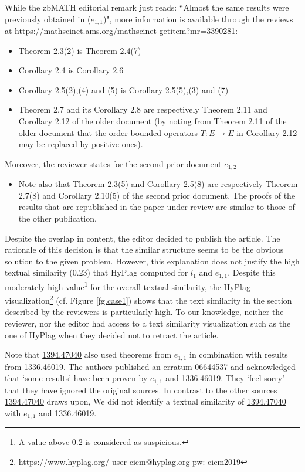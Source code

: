 \documentclass{llncs}
\newcommand{\zbl}[1]{\href{https://zbmath.org/?q=an:#1}{\textsf{#1}}}
\begin{document}
While the zbMATH editorial remark just reads: ``Almost the same results were previously obtained in ($e_{1,1}$)", more information is available through the reviews at \url{https://mathscinet.ams.org/mathscinet-getitem?mr=3390281}:
\begin{itemize}
\item Theorem 2.3(2) is Theorem 2.4(7)
\item Corollary 2.4 is Corollary 2.6
\item Corollary 2.5(2),(4) and (5) is Corollary 2.5(5),(3) and (7)
\item Theorem 2.7 and its Corollary 2.8 are respectively Theorem 2.11 and Corollary 2.12 of the older document (by noting from Theorem 2.11 of the older document that the order bounded operators $T:E\to E$ in Corollary 2.12 may be replaced by positive ones).
\end{itemize}
Moreover, the reviewer states for the second prior document $e_{1,2}$
\begin{itemize}
\item Note also that Theorem 2.3(5) and Corollary 2.5(8) are respectively Theorem 2.7(8) and Corollary 2.10(5) of the second prior document.
The proofs of the results that are republished in the paper under review are similar to those of the other publication.
\end{itemize}

Despite the overlap in content, the editor decided to publish the article. The rationale of this decision is that the similar structure seems to be the obvious solution to the given problem. However, this explanation does not justify the high textual similarity (0.23) that HyPlag computed for $l_1$ and $e_{1,1}$. Despite this moderately high value\footnote{A value above 0.2 is considered as suspicious.} for the overall textual similarity, the HyPlag visualization\footnote{\url{https://www.hyplag.org/} user cicm@hyplag.org pw: cicm2019} (cf. Figure \ref{fg.case1}) shows that the text similarity in the section described by the reviewers is particularly high. To our knowledge, neither the reviewer, nor the editor had access to a text similarity visualization such as the one of HyPlag when they decided not to retract the article.

Note that \zbl{1394.47040} also used theorems from $e_{1,1}$ in combination with results from \zbl{1336.46019}. The authors published an erratum \zbl{06644537} and acknowledged that `some results' have been proven by $e_{1,1}$ and \zbl{1336.46019}. They `feel sorry' that they have ignored the original sources. In contrast to the other sources \zbl{1394.47040} draws upon, We did not identify a textual similarity of \zbl{1394.47040} with $e_{1,1}$ and \zbl{1336.46019}.
\end{document}
